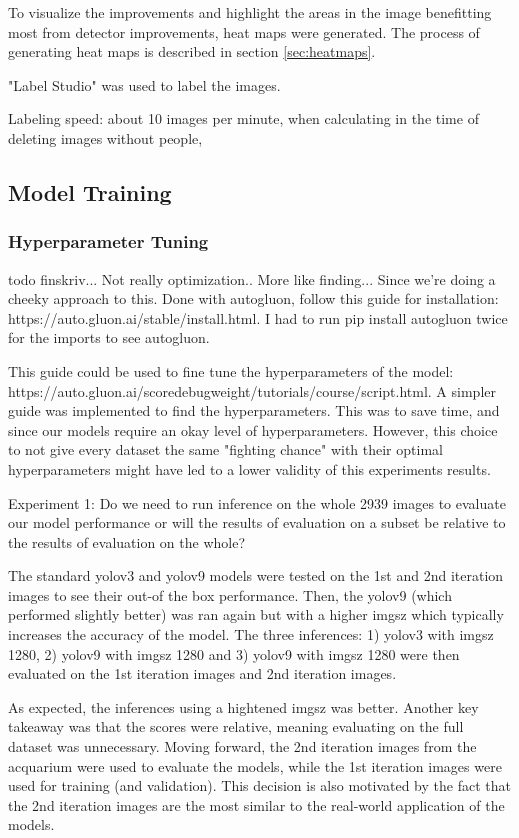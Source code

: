 To visualize the improvements and highlight the areas in the image benefitting most from detector improvements, heat maps were generated. The process of generating heat maps is described in section \ref{sec:heatmaps}.


"Label Studio" was used to label the images. 

Labeling speed: about 10 images per minute, when calculating in the time of deleting images without people,

\subsection{Model Training}
\label{sec:model_training}

\subsubsection{Hyperparameter Tuning}
todo finskriv... Not really optimization.. More like finding... Since we're doing a cheeky approach to this. Done with autogluon, follow this guide for installation: https://auto.gluon.ai/stable/install.html. I had to run pip install autogluon twice for the imports to see autogluon.

This guide could be used to fine tune the hyperparameters of the model: https://auto.gluon.ai/scoredebugweight/tutorials/course/script.html. A simpler guide was implemented to find the hyperparameters. This was to save time, and since our models require an okay level of hyperparameters. However, this choice to not give every dataset the same "fighting chance" with their optimal hyperparameters might have led to a lower validity of this experiments results. 

Experiment 1: Do we need to run inference on the whole 2939 images to evaluate our model performance or will the results of evaluation on a subset be relative to the results of evaluation on the whole?

The standard yolov3 and yolov9 models were tested on the 1st and 2nd iteration images to see their out-of the box performance. Then, the yolov9 (which performed slightly better) was ran again but with a higher imgsz which typically increases the accuracy of the model. The three inferences: 1) yolov3 with imgsz 1280, 2) yolov9 with imgsz 1280 and 3) yolov9 with imgsz 1280 were then evaluated on the 1st iteration images and 2nd iteration images. 

As expected, the inferences using a hightened imgsz was better. Another key takeaway was that the scores were relative, meaning evaluating on the full dataset was unnecessary. Moving forward, the 2nd iteration images from the acquarium were used to evaluate the models, while the 1st iteration images were used for training (and validation). This decision is also motivated by the fact that the 2nd iteration images are the most similar to the real-world application of the models.

